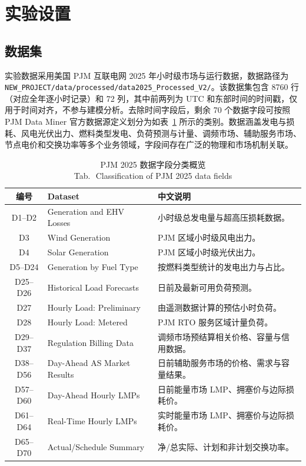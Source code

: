 \documentclass[UTF8,zihao=5,twoside]{ctexart}
\numberwithin{equation}{section}
\newcommand{\tabbicaption}[2]{%
  \caption{#1\\[-0.2em]\small Tab.\,\thetable\ #2}
}
\newcommand{\code}[1]{\texttt{#1}}
\begin{document}
\section{实验设置}
\subsection{数据集}
实验数据采用美国 PJM 互联电网 2025 年小时级市场与运行数据，数据路径为 \code{NEW\_PROJECT/data/processed/data2025\_Processed\_V2/}。该数据集包含 8760 行（对应全年逐小时记录）和 72 列，其中前两列为 UTC 和东部时间的时间戳，仅用于时间对齐，不参与建模分析。去除时间字段后，剩余 70 个数据字段可按照 PJM Data Miner 官方数据源定义划分为如表~\ref{tab:data_overview} 所示的类别。数据涵盖发电与损耗、风电光伏出力、燃料类型发电、负荷预测与计量、调频市场、辅助服务市场、节点电价和交换功率等多个业务领域，字段间存在广泛的物理和市场机制关联。

\begin{table}[!tbp]
\centering
\scriptsize
\setlength{\tabcolsep}{2pt}
\tabbicaption{PJM 2025 数据字段分类概览}{Classification of PJM 2025 data fields}
\label{tab:data_overview}
\begin{tabularx}{\columnwidth}{c>{\raggedright\arraybackslash}p{}X}
\toprule
编号 & Dataset & 中文说明 \\
\midrule
D1--D2 & Generation and EHV Losses & 小时级总发电量与超高压损耗数据。 \\
D3 & Wind Generation & PJM 区域小时级风电出力。 \\
D4 & Solar Generation & PJM 区域小时级光伏出力。 \\
D5--D24 & Generation by Fuel Type & 按燃料类型统计的发电出力与占比。 \\
D25--D26 & Historical Load Forecasts & 日前及最新可用负荷预测。 \\
D27 & Hourly Load: Preliminary & 由遥测数据计算的预估小时负荷。 \\
D28 & Hourly Load: Metered & PJM RTO 服务区域计量负荷。 \\
D29--D37 & Regulation Billing Data & 调频市场预结算相关价格、容量与信用数据。 \\
D38--D56 & Day-Ahead AS Market Results & 日前辅助服务市场的价格、需求与容量结果。 \\
D57--D60 & Day-Ahead Hourly LMPs & 日前能量市场 LMP、拥塞价与边际损耗价。 \\
D61--D64 & Real-Time Hourly LMPs & 实时能量市场 LMP、拥塞价与边际损耗价。 \\
D65--D70 & Actual/Schedule Summary & 净/总实际、计划和非计划交换功率。 \\
\bottomrule
\end{tabularx}
\end{table}
\end{document}
